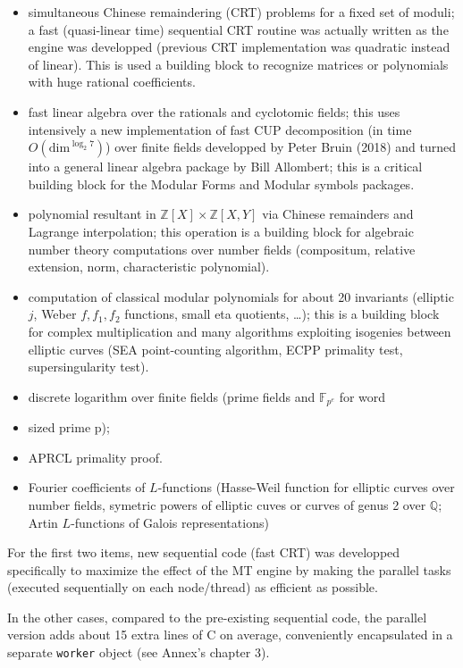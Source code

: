 \documentclass{deliverablereport}
\begin{document}
\begin{itemize}
\item simultaneous Chinese remaindering (CRT) problems for a fixed set of
  moduli; a fast (quasi-linear time) sequential CRT routine was actually
  written as the engine was developped (previous CRT implementation was
  quadratic instead of linear). This is used a building block to recognize
  matrices or polynomials with huge rational coefficients.
\item fast linear algebra over the rationals and cyclotomic fields; this 
  uses intensively a new implementation of fast CUP decomposition (in time
  $O(\text{dim}^{\log_2 7})$) over finite fields developped by Peter Bruin
  (2018) and turned into a general linear algebra package by Bill Allombert;
  this is a critical building block for the Modular Forms and Modular symbols
  packages.
\item  polynomial resultant in $\mathbb{Z}[X] \times \mathbb{Z}[X,Y]$
  via Chinese remainders and Lagrange interpolation; this operation is a
  building block for algebraic number theory computations over number
  fields (compositum, relative extension, norm, characteristic polynomial).
\item  computation of classical modular polynomials for about 20 invariants
  (elliptic $j$, Weber $f,f_1,f_2$ functions, small eta quotients, \dots);
    this is a building block for complex multiplication and many algorithms
    exploiting isogenies between elliptic curves (SEA point-counting
    algorithm, ECPP primality test, supersingularity test).
\item  discrete logarithm over finite fields (prime fields and
  $\mathbb{F}_{p^e}$ for word\item sized prime p);
\item  APRCL primality proof.
\item Fourier coefficients of $L$-functions (Hasse-Weil function for
  elliptic curves over number fields, symetric powers of elliptic cuves or
  curves of genus 2 over $\mathbb{Q}$; Artin $L$-functions of Galois
  representations)
\end{itemize}

For the first two items, new sequential code (fast CRT) was developped
specifically to maximize the effect of the MT engine by making the parallel
tasks (executed sequentially on each node/thread) as efficient as possible.

In the other cases, compared to the pre-existing sequential code, the
parallel version adds about 15 extra lines of C on average, conveniently
encapsulated in a separate \texttt{worker} object (see Annex's chapter 3).
\end{document}
